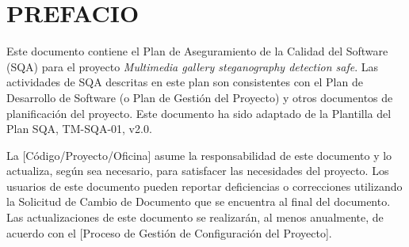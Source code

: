 ﻿\section*{PREFACIO}
Este documento contiene el Plan de Aseguramiento de la Calidad del Software (SQA) para el proyecto \textit{Multimedia gallery steganography detection safe}. Las actividades de SQA descritas en este plan son consistentes con el Plan de Desarrollo de Software (o Plan de Gestión del Proyecto) y otros documentos de planificación del proyecto. Este documento ha sido adaptado de la Plantilla del Plan SQA, TM-SQA-01, v2.0.

La [Código/Proyecto/Oficina] asume la responsabilidad de este documento y lo actualiza, según sea necesario, para satisfacer las necesidades del proyecto. Los usuarios de este documento pueden reportar deficiencias o correcciones utilizando la Solicitud de Cambio de Documento que se encuentra al final del documento. Las actualizaciones de este documento se realizarán, al menos anualmente, de acuerdo con el [Proceso de Gestión de Configuración del Proyecto].
